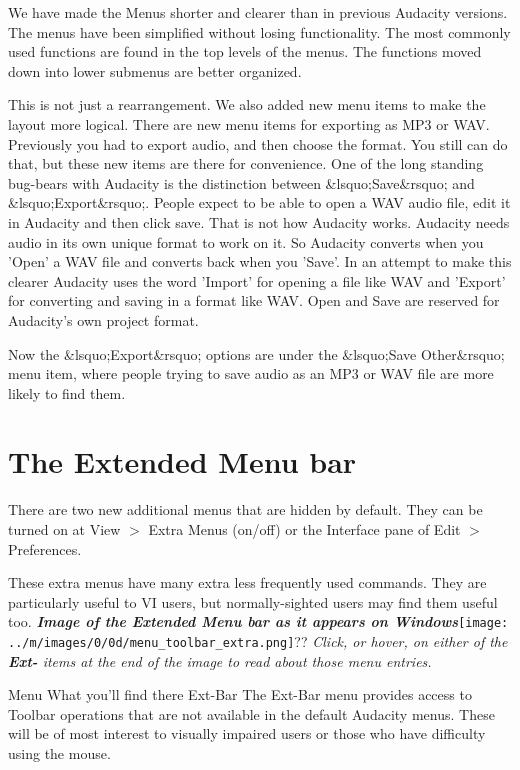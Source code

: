 \documentclass[twocolumn]{book}
\begin{document}
We have made the Menus shorter and clearer than in previous Audacity versions. The menus have been simplified without losing functionality. The most commonly used functions are found in the top levels of the menus. The functions moved down into lower submenus are better organized.

This is not just a rearrangement.  We also added new menu items to make the layout more logical.  There are new menu items for exporting as MP3 or WAV. Previously you had to export audio, and then choose the format. You still can do that, but these new items are there for convenience.
One of the long standing bug-bears with Audacity is the distinction between \&lsquo;Save\&rsquo; and \&lsquo;Export\&rsquo;. People expect to be able to open a WAV audio file, edit it in Audacity and then click save. That is not how Audacity works. Audacity needs audio in its own unique format to work on it. So Audacity converts when you 'Open' a WAV file and converts back when you 'Save'. In an attempt to make this clearer Audacity uses the word 'Import' for opening a file like WAV and 'Export' for converting and saving in a format like WAV. Open and Save are reserved for Audacity's own project format.

Now the \&lsquo;Export\&rsquo; options are under the \&lsquo;Save Other\&rsquo; menu item, where people trying to save audio as an MP3 or WAV file are more likely to find them. 



\section{The Extended Menu bar}


There are two new additional menus that are hidden by default.  They can be turned on at View \mbox{$>$} Extra Menus (on/off) or the Interface pane of Edit \mbox{$>$} Preferences.

These extra menus have many extra less frequently used commands.  They are particularly useful to VI users, but normally-sighted users may find them useful too.
\textit{\textbf{Image of the Extended Menu bar as it appears on Windows}}\texttt{[image: ../m/images/0/0d/menu\_toolbar\_extra.png]}??
\textit{Click, or hover, on either of the \textbf{Ext-} items at the end of the image to read about those menu entries.}

Menu
What you'll find there
Ext-Bar
The Ext-Bar menu provides access to Toolbar operations that are not available in the default Audacity menus. These will be of most interest to visually impaired users or those who have difficulty using the mouse.
\end{document}
